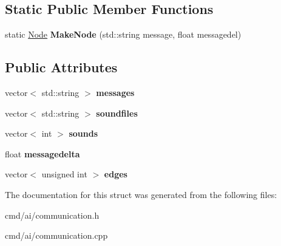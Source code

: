 \subsection*{Static Public Member Functions}
\begin{DoxyCompactItemize}
\item 
static \hyperlink{structFSM_1_1Node}{Node} {\bfseries Make\+Node} (std\+::string message, float messagedel)\hypertarget{structFSM_1_1Node_ab0bcc0918db470ce1214b4533379d0a9}{}\label{structFSM_1_1Node_ab0bcc0918db470ce1214b4533379d0a9}

\end{DoxyCompactItemize}
\subsection*{Public Attributes}
\begin{DoxyCompactItemize}
\item 
vector$<$ std\+::string $>$ {\bfseries messages}\hypertarget{structFSM_1_1Node_ac12bb4920789c57b3a8ab7a0964c08da}{}\label{structFSM_1_1Node_ac12bb4920789c57b3a8ab7a0964c08da}

\item 
vector$<$ std\+::string $>$ {\bfseries soundfiles}\hypertarget{structFSM_1_1Node_a4d697bc19d9e2f26ad950e515bca7988}{}\label{structFSM_1_1Node_a4d697bc19d9e2f26ad950e515bca7988}

\item 
vector$<$ int $>$ {\bfseries sounds}\hypertarget{structFSM_1_1Node_abdbab971ca8e03fe034ac9abefc9d576}{}\label{structFSM_1_1Node_abdbab971ca8e03fe034ac9abefc9d576}

\item 
float {\bfseries messagedelta}\hypertarget{structFSM_1_1Node_a0aa8a49bf12bc92809cd98b66cc6cc11}{}\label{structFSM_1_1Node_a0aa8a49bf12bc92809cd98b66cc6cc11}

\item 
vector$<$ unsigned int $>$ {\bfseries edges}\hypertarget{structFSM_1_1Node_ac7b9dc0baa1527b09ab63413792ce8aa}{}\label{structFSM_1_1Node_ac7b9dc0baa1527b09ab63413792ce8aa}

\end{DoxyCompactItemize}


The documentation for this struct was generated from the following files\+:\begin{DoxyCompactItemize}
\item 
cmd/ai/communication.\+h\item 
cmd/ai/communication.\+cpp\end{DoxyCompactItemize}
